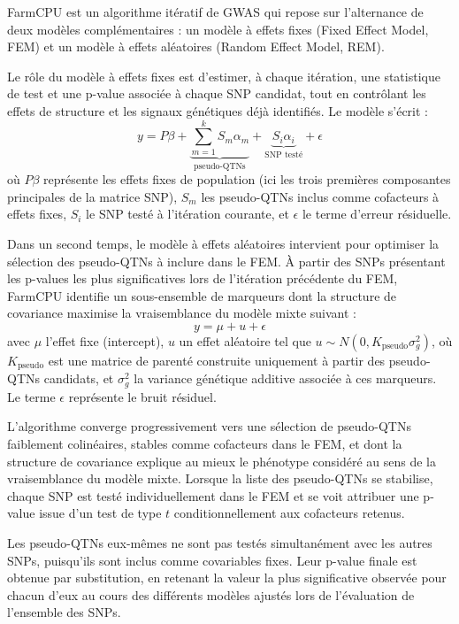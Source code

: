 \documentclass[
  11pt,
  letterpaper,
  DIV=11,
  numbers=noendperiod]{scrartcl}
\begin{document}
FarmCPU est un algorithme itératif de GWAS qui repose sur l'alternance
de deux modèles complémentaires : un modèle à effets fixes (Fixed Effect
Model, FEM) et un modèle à effets aléatoires (Random Effect Model, REM).

Le rôle du modèle à effets fixes est d'estimer, à chaque itération, une
statistique de test et une p-value associée à chaque SNP candidat, tout
en contrôlant les effets de structure et les signaux génétiques déjà
identifiés. Le modèle s'écrit :
\[y = P\beta + \underbrace{\sum_{m=1}^{k} S_m\alpha_m}_{\text{pseudo-QTNs}} + \underbrace{S_{i}\alpha_{i}}_{\text{SNP testé}} + \epsilon\]
où \(P\beta\) représente les effets fixes de population (ici les trois
premières composantes principales de la matrice SNP), \(S_m\) les
pseudo-QTNs inclus comme cofacteurs à effets fixes, \(S_i\) le SNP testé
à l'itération courante, et \(\epsilon\) le terme d'erreur résiduelle.

Dans un second temps, le modèle à effets aléatoires intervient pour
optimiser la sélection des pseudo-QTNs à inclure dans le FEM. À partir
des SNPs présentant les p-values les plus significatives lors de
l'itération précédente du FEM, FarmCPU identifie un sous-ensemble de
marqueurs dont la structure de covariance maximise la vraisemblance du
modèle mixte suivant : \[y = \mu + u + \epsilon\] avec \(\mu\) l'effet
fixe (intercept), \(u\) un effet aléatoire tel que
\(u \sim N(0, K_{\text{pseudo}} \sigma_g^2)\), où \(K_{\text{pseudo}}\)
est une matrice de parenté construite uniquement à partir des
pseudo-QTNs candidats, et \(\sigma_g^2\) la variance génétique additive
associée à ces marqueurs. Le terme \(\epsilon\) représente le bruit
résiduel.

L'algorithme converge progressivement vers une sélection de pseudo-QTNs
faiblement colinéaires, stables comme cofacteurs dans le FEM, et dont la
structure de covariance explique au mieux le phénotype considéré au sens
de la vraisemblance du modèle mixte. Lorsque la liste des pseudo-QTNs se
stabilise, chaque SNP est testé individuellement dans le FEM et se voit
attribuer une p-value issue d'un test de type \(t\) conditionnellement
aux cofacteurs retenus.

Les pseudo-QTNs eux-mêmes ne sont pas testés simultanément avec les
autres SNPs, puisqu'ils sont inclus comme covariables fixes. Leur
p-value finale est obtenue par substitution, en retenant la valeur la
plus significative observée pour chacun d'eux au cours des différents
modèles ajustés lors de l'évaluation de l'ensemble des SNPs.
\end{document}
